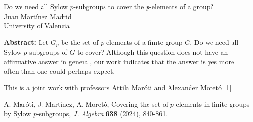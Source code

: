 \documentclass[12pt,a4paper]{article}
\begin{document}
\thispagestyle{empty} 
\begin{center}
{\large  Do we need all Sylow $p$-subgroups to cover the $p$-elements of a group?}\\
\vspace*{.5cm}
Juan Mart\'inez Madrid\\
University of Valencia\\
\end{center}
\vspace*{.8cm}

{\bf Abstract:} Let $G_p$ be the set of $p$-elements of a finite group $G$. Do we need all Sylow $p$-subgroups of $G$ to cover? Although
this question does not have an affirmative answer in general,
our work indicates that the answer is yes more often than one
could perhaps expect.

This is a joint work with professors Attila Mar\'oti  and Alexander Moret\'o [1].

\begin{enumerate}[label={[\arabic*]}]
\item A. Mar\'oti, J. Mart\'{\i}nez, A. Moret\'o, \rm{Covering the set of $p$-elements in finite groups by Sylow $p$-subgroups}, \textit{J. Algebra} \textbf{638} (2024), 840-861.
\end{enumerate}
											
\end{document}
